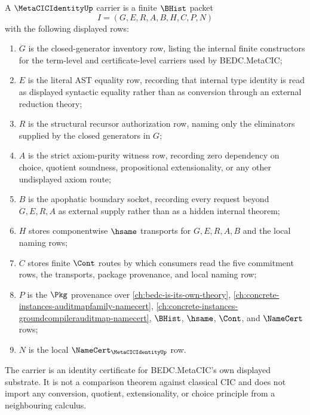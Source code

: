 \begin{definition}
\label{def:metacic-identity-carrier}
A $\MetaCICIdentityUp$ carrier is a finite $\BHist$ packet
$$
I=(G,E,R,A,B,H,C,P,N)
$$
with the following displayed rows:
\begin{enumerate}
\item $G$ is the closed-generator inventory row, listing the internal finite constructors for the term-level and certificate-level carriers used by BEDC.MetaCIC;
\item $E$ is the literal AST equality row, recording that internal type identity is read as displayed syntactic equality rather than as conversion through an external reduction theory;
\item $R$ is the structural recursor authorization row, naming only the eliminators supplied by the closed generators in $G$;
\item $A$ is the strict axiom-purity witness row, recording zero dependency on choice, quotient soundness, propositional extensionality, or any other undisplayed axiom route;
\item $B$ is the apophatic boundary socket, recording every request beyond $G,E,R,A$ as external supply rather than as a hidden internal theorem;
\item $H$ stores componentwise $\hsame$ transports for $G,E,R,A,B$ and the local naming rows;
\item $C$ stores finite $\Cont$ routes by which consumers read the five commitment rows, the transports, package provenance, and local naming row;
\item $P$ is the $\Pkg$ provenance over \autoref{ch:bedc-is-its-own-theory}, \autoref{ch:concrete-instances-auditmapfamily-namecert}, \autoref{ch:concrete-instances-groundcompilerauditmap-namecert}, $\BHist$, $\hsame$, $\Cont$, and $\NameCert$ rows;
\item $N$ is the local $\NameCert_{\MetaCICIdentityUp}$ row.
\end{enumerate}
The carrier is an identity certificate for BEDC.MetaCIC's own displayed substrate. It is not a comparison theorem against classical CIC and does not import any conversion, quotient, extensionality, or choice principle from a neighbouring calculus.
\end{definition}

